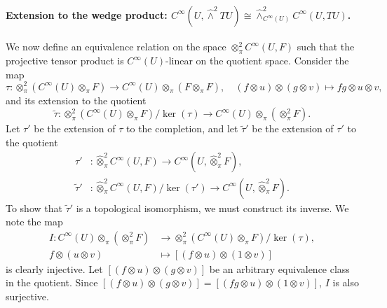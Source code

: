 \documentclass[11pt,reqno]{amsart}
\theoremstyle{definition}
\numberwithin{equation}{section}
\begin{document}
\paragraph{Extension to the wedge product: $C^{\infty}(U, \hat\wedge^2 TU) \cong \hat\wedge^2_{C^{\infty}(U)}C^{\infty}(U, TU)$.}
We now define an equivalence relation on the space $\otimes^2_{\pi}C^{\infty}(U, F)$ such that the projective tensor product is $C^{\infty}(U)$-linear on the quotient space. Consider the map 
\[
\tau : \otimes^2_{\pi}(C^{\infty}(U) \otimes_{\pi} F) \rightarrow C^{\infty}(U) \otimes_{\pi} (F \otimes_{\pi} F), \quad (f \otimes u) \otimes (g \otimes v) \mapsto fg \otimes u \otimes v,
\]  
and its extension to the quotient 
\[
\tilde{\tau}: \otimes^2_{\pi}(C^{\infty}(U) \otimes_{\pi} F)/\ker(\tau) \rightarrow C^{\infty}(U)\otimes_{\pi}(\otimes_{\pi}^2 F).
\]
Let $\tau'$ be the extension of $\tau$ to the completion, and let $\tilde{\tau}'$ be the extension of $\tau'$ to the quotient
\begin{align*} 
\tau'&: \hat{\otimes}_{\pi}^2 C^{\infty}(U, F) \rightarrow C^{\infty}(U, \hat{\otimes}_{\pi}^2 F), \\
\tilde{\tau}'&: \hat{\otimes}_{\pi}^2 C^{\infty}(U, F)/\ker(\tau') \rightarrow C^{\infty}(U, \hat\otimes^2_{\pi}F).
\end{align*}
To show that $\tilde{\tau}'$ is a topological isomorphism, we must construct its inverse. We note the map
\begin{align*} 
I : C^{\infty}(U) \otimes_{\pi} (\otimes^2_{\pi}F) &\rightarrow \otimes^2_{\pi}(C^{\infty}(U) \otimes_{\pi} F)/\ker(\tau), \\
f \otimes (u \otimes v) &\mapsto [(f \otimes u) \otimes (1 \otimes v)] 
\end{align*} 
is clearly injective. Let $[(f \otimes u) \otimes (g \otimes v)]$ be an arbitrary equivalence class in the quotient. Since $[(f \otimes u) \otimes (g \otimes v)] = [(fg \otimes u) \otimes (1 \otimes v)]$, $I$ is also surjective.
\end{document}

